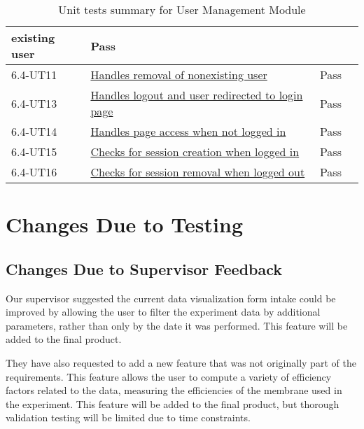 \documentclass[12pt, titlepage]{article}
\begin{document}
\begin{table}[H]
\begin{tabular}{|l|l|l|l|}
{    existing user} & Pass\\
    \hline
    6.4-UT11 &
    \href{https://github.com/SumanyaG/Alkalytics/blob/main/src/backend/test/userServiceTest.py}{Handles
    removal of nonexisting user} & Pass\\
    \hline
    6.4-UT13 &
    \href{https://github.com/SumanyaG/Alkalytics/blob/main/src/frontend/test/components/auth/AccountMenu.test.tsx}{Handles
    logout and user redirected to login page} & Pass\\
    \hline
    6.4-UT14 &
    \href{https://github.com/SumanyaG/Alkalytics/blob/main/src/frontend/test/components/auth/ProtectedRoute.test.tsx}{Handles
    page access when not logged in} & Pass\\
    \hline
    6.4-UT15 &
    \href{https://github.com/SumanyaG/Alkalytics/blob/main/src/frontend/test/context/authContext.test.tsx}{Checks
    for session creation when logged in} & Pass\\
    \hline
    6.4-UT16 &
    \href{https://github.com/SumanyaG/Alkalytics/blob/main/src/frontend/test/context/authContext.test.tsx}{Checks
    for session removal when logged out} & Pass\\
    \hline
  \end{tabular}
  \caption{Unit tests summary for User Management Module}
  \label{UT:UM}
\end{table}

\section{Changes Due to Testing}
\subsection{Changes Due to Supervisor Feedback}

Our supervisor suggested the current data visualization form intake could be
improved by allowing the user to filter the experiment data by additional
parameters, rather than only by the date it was performed. This feature will be
added to the final product.

They have also requested to add a new feature that was not originally part of
the requirements. This feature allows the user to compute a variety of
efficiency factors related to the data, measuring the efficiencies of the
membrane used in the experiment. This feature will be added to the final
product, but thorough validation testing will be limited due to time
constraints.
\end{document}
